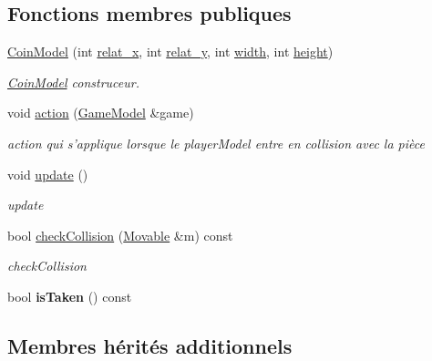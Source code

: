 \subsection*{Fonctions membres publiques}
\begin{DoxyCompactItemize}
\item 
\hyperlink{class_coin_model_ab044e491e7cee8e6abe2ac15c1fee57e}{Coin\+Model} (int \hyperlink{class_obstacle_a37056563c8469b38aa240c7c423d7280}{relat\+\_\+x}, int \hyperlink{class_obstacle_a754f463db00e74fd5d66a758e4458c26}{relat\+\_\+y}, int \hyperlink{class_movable_a7e4607cccfcc96d2007c2e39c44cab54}{width}, int \hyperlink{class_movable_a192073065bc62d054f259c3b1522c09e}{height})
\begin{DoxyCompactList}\small\item\em \hyperlink{class_coin_model}{Coin\+Model} construceur. \end{DoxyCompactList}\item 
void \hyperlink{class_coin_model_aaa2e117d4a7cb137443c65c483111a21}{action} (\hyperlink{class_game_model}{Game\+Model} \&game)
\begin{DoxyCompactList}\small\item\em action qui s'applique lorsque le player\+Model entre en collision avec la pièce \end{DoxyCompactList}\item 
\hypertarget{class_coin_model_a683b01673b509acd9eebe16780d2fae7}{void \hyperlink{class_coin_model_a683b01673b509acd9eebe16780d2fae7}{update} ()}\label{class_coin_model_a683b01673b509acd9eebe16780d2fae7}

\begin{DoxyCompactList}\small\item\em update \end{DoxyCompactList}\item 
bool \hyperlink{class_coin_model_a48879b62108c8d9830e9e3e059b10fb3}{check\+Collision} (\hyperlink{class_movable}{Movable} \&m) const 
\begin{DoxyCompactList}\small\item\em check\+Collision \end{DoxyCompactList}\item 
\hypertarget{class_coin_model_a1fd0cba3278a91ddf4abe36456a99390}{bool {\bfseries is\+Taken} () const }\label{class_coin_model_a1fd0cba3278a91ddf4abe36456a99390}

\end{DoxyCompactItemize}
\subsection*{Membres hérités additionnels}


